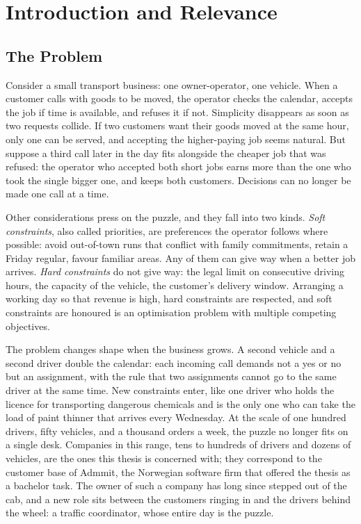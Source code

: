 \chapter{Introduction and Relevance}
\label{chap:introduction}

\section{The Problem}
\label{sec:problem}

Consider a small transport business: one owner-operator, one vehicle. When a customer calls with goods to be moved, the operator checks the calendar, accepts the job if time is available, and refuses it if not. Simplicity disappears as soon as two requests collide. If two customers want their goods moved at the same hour, only one can be served, and accepting the higher-paying job seems natural. But suppose a third call later in the day fits alongside the cheaper job that was refused: the operator who accepted both short jobs earns more than the one who took the single bigger one, and keeps both customers. Decisions can no longer be made one call at a time.

Other considerations press on the puzzle, and they fall into two kinds. \emph{Soft constraints}, also called priorities, are preferences the operator follows where possible: avoid out-of-town runs that conflict with family commitments, retain a Friday regular, favour familiar areas. Any of them can give way when a better job arrives. \emph{Hard constraints} do not give way: the legal limit on consecutive driving hours, the capacity of the vehicle, the customer's delivery window. Arranging a working day so that revenue is high, hard constraints are respected, and soft constraints are honoured is an optimisation problem with multiple competing objectives.

The problem changes shape when the business grows. A second vehicle and a second driver double the calendar: each incoming call demands not a yes or no but an assignment, with the rule that two assignments cannot go to the same driver at the same time. New constraints enter, like one driver who holds the licence for transporting dangerous chemicals and is the only one who can take the load of paint thinner that arrives every Wednesday. At the scale of one hundred drivers, fifty vehicles, and a thousand orders a week, the puzzle no longer fits on a single desk. Companies in this range, tens to hundreds of drivers and dozens of vehicles, are the ones this thesis is concerned with; they correspond to the customer base of Admmit, the Norwegian software firm that offered the thesis as a bachelor task. The owner of such a company has long since stepped out of the cab, and a new role sits between the customers ringing in and the drivers behind the wheel: a traffic coordinator, whose entire day is the puzzle.

